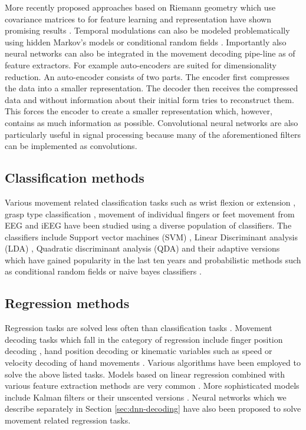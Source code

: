 More recently proposed approaches based on Riemann geometry which use covariance matrices to for feature learning and representation have shown promising results \cite{}. 
Temporal modulations can also be modeled problematically using hidden Markov's models or conditional random fields \cite{markov-models-decoding, bayesian-decoding}. 
Importantly also neural networks can also be integrated in the movement decoding pipe-line as of feature extractors. For example auto-encoders are suited for dimensionality reduction.
An auto-encoder consists of two parts.
The encoder first compresses the data into a smaller representation.
The decoder then receives the compressed data and without information about their initial form tries to reconstruct them. This forces the encoder to create a smaller representation which, however, contains as much information as possible. 
Convolutional neural networks are also particularly useful in signal processing because many of the aforementioned filters can be implemented as convolutions. \\



\subsection{Classification methods}
Various movement related classification tasks such as wrist flexion or extension \cite{}, grasp type classification \cite{}, movement of individual fingers \cite{cond-rf-finger-class, lda-finger-movement-classification} or feet movement \cite{} from EEG and iEEG have been studied using a diverse population of classifiers.  
The classifiers include Support vector machines (SVM) \cite{svm-alg}, Linear Discriminant analysis (LDA) \cite{lda-paper}, Quadratic discriminant analysis (QDA) \cite{qda-paper} and their adaptive versions which have gained popularity in the last ten years \cite{lotte2018review} and probabilistic methods such as conditional random fields or naive bayes classifiers \cite{}. \\


\subsection{Regression methods}
Regression tasks are solved less often than classification tasks \cite{volkova-review}.
Movement decoding tasks which fall in the category of regression include finger position decoding \cite{Pistohl2008PredictionOA}, hand position decoding \cite{ball-2019} or
kinematic variables such as speed or velocity decoding of hand movements \cite{hammer-role-2013, hammer-predominance-2016, Hammer-2021, kalman-filters-velocity, linear-regression-eeg-hand-3d}.
Various algorithms have been employed to solve the above listed tasks. 
Models based on linear regression combined with various feature extraction methods are very common \cite{hammer-role-2013, hammer-predominance-2016, eeg-hand-moving, linear-regression-eeg-hand-3d}.
More sophisticated models include Kalman filters \cite{kalman-filters-velocity} or their unscented versions \cite{uns-kalman-filters-gait-decoding}.
Neural networks which we describe separately in Section \ref{sec:dnn-decoding} have also been proposed to solve movement related regression tasks.


